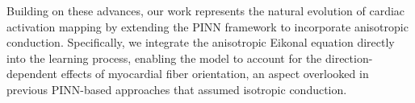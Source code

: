 Building on these advances, our work represents the natural evolution of cardiac activation mapping by extending the PINN framework to incorporate anisotropic conduction. Specifically, we integrate the anisotropic Eikonal equation \cite{ColliFranzone1990} directly into the learning process, enabling the model to account for the direction-dependent effects of myocardial fiber orientation, an aspect overlooked in previous PINN-based approaches that assumed isotropic conduction.